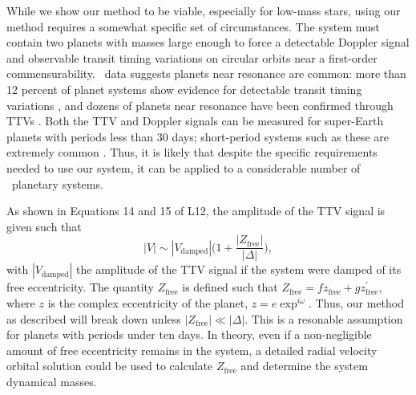 While we show our method to be viable, especially for low-mass stars, using our method requires a somewhat specific set of circumstances. The system must contain two planets with masses large enough to force a detectable Doppler signal and observable transit timing variations on circular orbits near a first-order commensurability. \kep\ data suggests planets near resonance are common: more than 12 percent of planet systems show evidence for detectable transit timing variations \citep{Ford12a}, and dozens of planets near resonance have been confirmed through TTVs \citep{Steffen13}. Both the TTV and Doppler signals can be measured for super-Earth planets with periods less than 30 days; short-period systems such as these are extremely common \citep{Howard12}. Thus, it is likely that despite the specific requirements needed to use our system, it can be applied to a considerable number of \kep\ planetary systems.

As shown in Equations 14 and 15 of L12, the amplitude of the TTV signal is given such that
\begin{equation}
|V| \sim |V_\textrm{damped}|\bigg(1 + \frac{|Z_\textrm{free}|}{|\Delta|}\bigg),
\end{equation}
with $|V_\textrm{damped}|$ the amplitude of the TTV signal if the system were damped of its free eccentricity. The quantity $Z_\textrm{free}$ is defined such that $Z_\textrm{free} = f z_\textrm{free} + g z^\prime_\textrm{free}$, where $z$ is the complex eccentricity of the planet, $z = e\exp^{i \omega}$. Thus, our method as described will break down unless $|Z_{\textrm{free}}| \ll |\Delta|$. This is a resonable assumption for planets with periods under ten days. In theory, even if a non-negligible amount of free eccentricity remains in the system, a detailed radial velocity orbital solution could be used to calculate $Z_{\textrm{free}}$ and determine the system dynamical masses.

